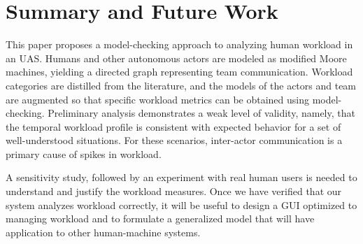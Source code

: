 \section{Summary and Future Work}
This paper proposes a model-checking approach to analyzing human workload in an UAS.  Humans and other autonomous actors are modeled as modified Moore machines, yielding a directed graph representing team communication.  Workload categories are distilled from the literature, and the models of the actors and team are augmented so that specific workload metrics can be obtained using model-checking.  Preliminary analysis demonstrates a weak level of validity, namely, that the temporal workload profile is consistent with expected behavior for a set of well-understood situations.  For these scenarios, inter-actor communication is a primary cause of spikes in workload. 

A sensitivity study, followed by an experiment with real human users is needed to understand and justify the workload measures. Once we have verified that our system analyzes workload correctly, it will be useful to design a GUI optimized to managing workload and to formulate a generalized model that will have application to other human-machine systems.
